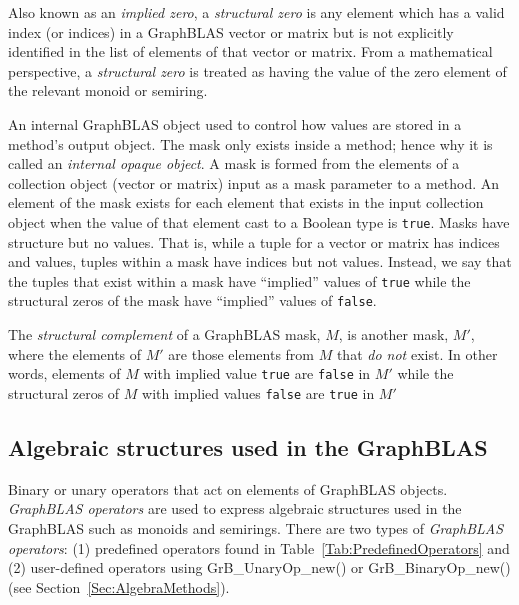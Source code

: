  Also known as an \emph{implied zero}, a \emph{structural zero} is 
any element which has a valid index (or indices) in a GraphBLAS vector or matrix 
but is not explicitly identified in the list of elements of that vector or matrix. From 
a mathematical perspective, a \emph{structural zero} is treated as having the 
value of the zero element of the relevant monoid or semiring.

 An internal GraphBLAS object used to control how values 
are stored in a method's output object.  The mask only exists inside a method; hence
why it is called an \emph{internal opaque object}.  A mask is formed from the elements of
a collection object (vector or matrix) input as a mask parameter to a method. An element of 
the mask exists for each element that exists in the input collection object when the value of 
that element cast to a Boolean type is {\tt true}.  Masks have structure but no values. That is,
while a tuple for a vector or matrix has indices and values,  tuples within a mask
have indices but not values. Instead, we say that the tuples that exist within a mask
have ``implied'' values of {\tt true} while the structural zeros of the mask have 
``implied'' values of {\tt false}.

 The \emph{structural complement} of a 
GraphBLAS mask, $M$, is another mask, $M'$, where the elements of $M'$
are those elements from $M$ that \emph{do not} exist.  In other words, 
elements of $M$ with implied value {\tt true} are {\tt false} in $M'$
while the structural zeros of $M$ with implied values {\tt false} 
are {\tt true} in $M'$


\glossEnd



\subsection{Algebraic structures used in the GraphBLAS}

\glossBegin
{} Binary or unary operators that act on elements of GraphBLAS 
objects.  \emph{GraphBLAS operators} are used to express algebraic structures used in the 
GraphBLAS such as monoids and semirings. There are two 
types of \emph{GraphBLAS operators}: (1) predefined operators found in Table~\ref{Tab:PredefinedOperators} 
and (2) user-defined operators using {\sf GrB\_UnaryOp\_new()} or {\sf GrB\_BinaryOp\_new()} (see Section~\ref{Sec:AlgebraMethods}).

